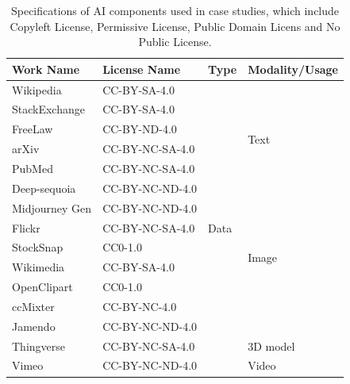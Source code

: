 \begin{table}[t]
    \caption{Specifications of AI components used in case studies, which include \textcolor{Copyleft}{Copyleft License}, \textcolor{Permissive}{Permissive License}, \textcolor{Public}{Public Domain Licens} and No Public License.}
    \footnotesize
    \label{tab:works}
    \begin{tabular}{|p{1.6cm}|p{3cm}|p{0.6cm}|p{1.7cm}|}
        \hline
        \rowcolor[gray]{.8}
        \textbf{Work Name} & \textbf{License Name} & \textbf{Type} & \textbf{Modality/Usage}  \\ \hline
        Wikipedia & \textcolor{Copyleft}{CC-BY-SA-4.0} & \multirow{15}{*}{Data} & \multirow{6}{*}{Text}   \\ \cline{1-2}
        StackExchange & \textcolor{Copyleft}{CC-BY-SA-4.0}  &  &    \\ \cline{1-2}
        FreeLaw & CC-BY-ND-4.0 &  &   \\ \cline{1-2}
        arXiv & \textcolor{Copyleft}{CC-BY-NC-SA-4.0} &  &   \\ \cline{1-2}
        PubMed & \textcolor{Copyleft}{CC-BY-NC-SA-4.0} &  &    \\ \cline{1-2}
        Deep-sequoia & CC-BY-NC-ND-4.0 &  &   \\ \cline{1-2} \cline{4-4}

        Midjourney Gen & CC-BY-NC-ND-4.0 &  & \multirow{6}{*}{Image}  \\ \cline{1-2}
        Flickr & \textcolor{Copyleft}{CC-BY-NC-SA-4.0} &  &   \\ \cline{1-2}
        StockSnap & \textcolor{Public}{CC0-1.0} &  &   \\ \cline{1-2}
        Wikimedia & \textcolor{Copyleft}{CC-BY-SA-4.0} &  &   \\ \cline{1-2}
        OpenClipart & \textcolor{Public}{CC0-1.0} &  &   \\ \cline{1-2} \cline{4-4}
        
        ccMixter & \textcolor{Permissive}{CC-BY-NC-4.0} & & \multirow{2}{*}{Voice}  \\ \cline{1-2}
        Jamendo & CC-BY-NC-ND-4.0 &  &   \\ \cline{1-2} \cline{4-4}
        
        Thingverse & \textcolor{Copyleft}{CC-BY-NC-SA-4.0} &  & 3D model  \\ \cline{1-2} \cline{4-4}

        Vimeo & CC-BY-NC-ND-4.0 &  & Video  \\ \hline


\end{tabular}
\end{table}
